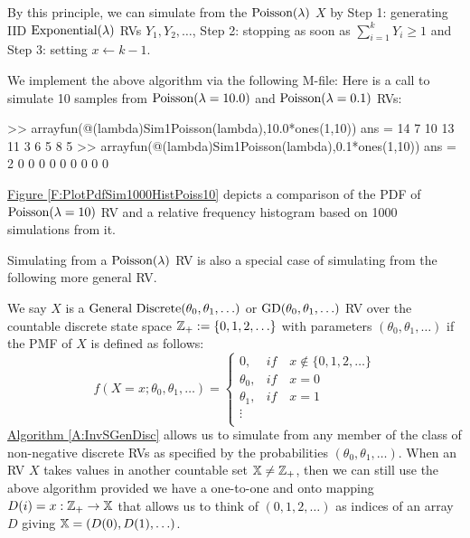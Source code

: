 \begin{simulation}\label{SIM:Poisson}
By this principle, we can simulate from the $\mbox{{\rm Poisson}}(\lambda)$ $X$ by {\sf Step 1}: generating IID $\mbox{{\rm Exponential}}(\lambda)$ RVs $Y_1,Y_2,\ldots$, {\sf Step 2}: stopping as soon as $\sum_{i=1}^k Y_i \geq 1$ and {\sf Step 3:} setting $x \gets k-1$.

We implement the above algorithm via the following M-file:
Here is a call to simulate 10 samples from $\mbox{{\rm Poisson}}(\lambda=10.0)$ and $\mbox{{\rm Poisson}}(\lambda=0.1)$ RVs:
\begin{VrbM}
>> arrayfun(@(lambda)Sim1Poisson(lambda),10.0*ones(1,10)) %
ans =    14     7    10    13    11     3     6     5     8     5
>> arrayfun(@(lambda)Sim1Poisson(lambda),0.1*ones(1,10)) %
ans =     2     0     0     0     0     0     0     0     0     0
\end{VrbM}
\hyperref[F:PlotPdfSim1000HistPoiss10]{Figure \ref*{F:PlotPdfSim1000HistPoiss10}} depicts a comparison of the PDF of $\mbox{{\rm Poisson}}(\lambda=10)$ RV and a relative frequency histogram based on 1000 simulations from it.
\end{simulation}

Simulating from a $\mbox{{\rm Poisson}}(\lambda)$ RV is also a special case of simulating from the following more general RV.
\begin{model}
We say $X$ is a $\mbox{{\rm General Discrete}}(\theta_0,\theta_1,\ldots)$ or $\mbox{{\rm GD}}(\theta_0,\theta_1,\ldots)$ RV over the countable discrete state space $\mathbb{Z}_+ := \{0,1,2,\ldots\}$ with parameters $(\theta_0,\theta_1,\ldots)$ if the PMF of $X$ is defined as follows:
\[
f(X=x; \theta_0,\theta_1,\ldots) =
\begin{cases}
0, & if \quad x \notin  \{0,1,2,\ldots\} \\
 \theta_0, & if \quad x=0 \\
 \theta_1, & if \quad x=1 \\
\vdots & \\
\end{cases}
\]
\hyperref[A:InvSGenDisc]{Algorithm \ref*{A:InvSGenDisc}} allows us to simulate from any member of the class of non-negative discrete RVs as specified by the probabilities $(\theta_0,\theta_1,\ldots)$.  When an RV $X$ takes  values in another countable set $\mathbb{X} \neq \mathbb{Z}_+$, then we can still use the above algorithm provided we have a one-to-one and onto mapping $D(i)=x: \mathbb{Z}_+ \to \mathbb{X}$ that allows us to think of $\left(0,1,2,\ldots\right)$ as indices of an array $D$ giving $\mathbb{X} = \left(D(0), D(1), \ldots \right)$.
\end{model}

